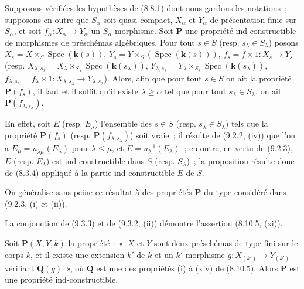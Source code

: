 \begin{proposition}[9.3.3]
\label{IV.9.3.3-fr}
Supposons vérifiées les hypothèses de \textup{(8.8.1)} dont nous gardons les
notations~; supposons en outre que $S_\alpha$ soit quasi-compact, $X_\alpha$
et $Y_\alpha$ de présentation finie sur $S_\alpha$, et soit
$f_\alpha:X_\alpha\to Y_\alpha$ un $S_\alpha$-morphisme. Soit $\boldsymbol{P}$ une
propriété ind-constructible de morphismes de préschémas algébriques. Pour tout
$s\in S$ \textup{(resp.} $s_\lambda\in S_\lambda$\textup{)} posons
$X_s=X\times_S\operatorname{Spec}(\boldsymbol{k}(s))$,
$Y_s=Y\times_S(\operatorname{Spec}(\boldsymbol{k}(s)))$,
$f_s=f\times1:X_s\to Y_s$ \textup{(resp.}
$X_{\lambda,s_\lambda}=X_\lambda\times_{S_\lambda}
\operatorname{Spec}(\boldsymbol{k}(s_\lambda))$,
$Y_{\lambda,s_\lambda}=Y_\lambda\times_{S_\lambda}
\operatorname{Spec}(\boldsymbol{k}(s_\lambda))$,
$f_{\lambda,s_\lambda}=f_\lambda\times1:
X_{\lambda,s_\lambda}\to Y_{\lambda,s_\lambda}$\textup{)}. Alors, afin que pour
tout $s\in S$ on ait la propriété $\boldsymbol{P}(f_s)$, il faut et il suffit
qu'il existe $\lambda\geqslant\alpha$ tel que pour tout
$s_\lambda\in S_\lambda$, on ait $\boldsymbol{P}(f_{\lambda,s_\lambda})$.
\end{proposition}

En effet, soit $E$ (resp. $E_\lambda$) l'ensemble des $s\in S$ (resp.
$s_\lambda\in S_\lambda$) tels que la propriété $\boldsymbol{P}(f_s)$ (resp.
$\boldsymbol{P}(f_{\lambda,s_\lambda})$) soit vraie~; il résulte de
(9.2.2, (iv)) que l'on a
$E_\mu=u_{\lambda\mu}^{-1}(E_\lambda)$ pour $\lambda\leqslant\mu$, et
$E=u_\lambda^{-1}(E_\lambda)$~; en outre, en vertu de (9.2.3), $E$ (resp.
$E_\lambda$) est ind-constructible dans $S$ (resp. $S_\lambda$)~; la
proposition résulte donc de (8.3.4) appliqué à la partie ind-constructible
$E$ de $S$.

On généralise sans peine ce résultat à des propriétés $\boldsymbol{P}$ du type
considéré dans (9.2.3, (i) et (ii)).

\begin{remark}[9.3.4]
\label{IV.9.3.4-fr}
La conjonction de (9.3.3) et de (9.3.2, (ii)) démontre l'assertion
(8.10.5, (xi)).
\end{remark}

\begin{proposition}[9.3.5]
\label{IV.9.3.5-fr}
Soit $\boldsymbol{P}(X,Y,k)$ la propriété~: «~$X$ et $Y$ sont deux préschémas de
type fini sur le corps $k$, et il existe une extension $k'$ de $k$ et un
$k'$-morphisme $g:X_{(k')}\to Y_{(k')}$ vérifiant $\boldsymbol{Q}(g)$~», où
$\boldsymbol{Q}$ est une des propriétés \textup{(i)} à \textup{(xiv)} de \textup{(8.10.5)}. Alors $\boldsymbol{P}$
est une propriété ind-constructible.
\end{proposition}

